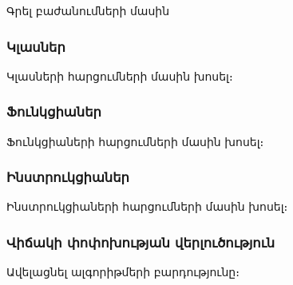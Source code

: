 {
    Գրել բաժանումների մասին
    \subsubsection*{Կլասներ}
    Կլասների հարցումների մասին խոսել։

    \subsubsection*{Ֆունկցիաներ}
    Ֆունկցիաների հարցումների մասին խոսել։

    \subsubsection*{Ինստրուկցիաներ}
    Ինստրուկցիաների հարցումների մասին խոսել։

    \subsubsection*{Վիճակի փոփոխության վերլուծություն}
    Ավելացնել ալգորիթմերի բարդությունը։
}